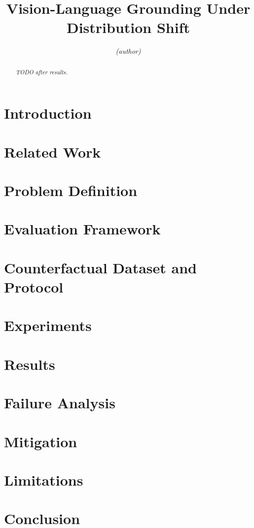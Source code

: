\documentclass[11pt]{article}
\title{Vision-Language Grounding Under Distribution Shift}
\author{\textit{(author)}}
\begin{document}
\maketitle
\begin{abstract}\textit{TODO after results.}\end{abstract}
\section{Introduction}
\section{Related Work}
\section{Problem Definition}
\section{Evaluation Framework}
\section{Counterfactual Dataset and Protocol}
\section{Experiments}
\section{Results}
\section{Failure Analysis}
\section{Mitigation}
\section{Limitations}
\section{Conclusion}


\end{document}
